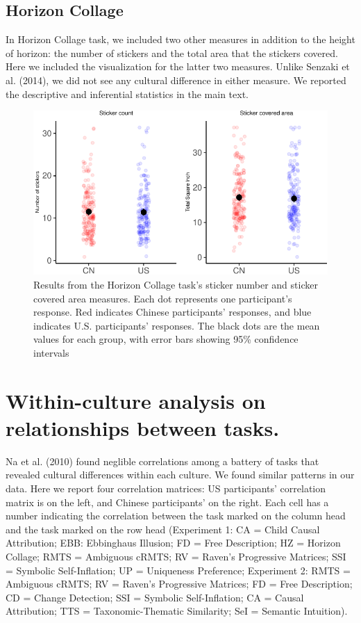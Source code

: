\documentclass[
  man,floatsintext]{apa6}
\begin{document}
\hypertarget{horizon-collage-2}{%
\subsection{Horizon Collage}\label{horizon-collage-2}}

In Horizon Collage task, we included two other measures in addition to the height of horizon: the number of stickers and the total area that the stickers covered. Here we included the visualization for the latter two measures. Unlike Senzaki et al. (2014), we did not see any cultural difference in either measure. We reported the descriptive and inferential statistics in the main text.

\begin{figure}
\centering
\includegraphics{CCRR_manuscript_files/figure-latex/unnamed-chunk-50-1.pdf}
\caption{\label{fig:unnamed-chunk-50}Results from the Horizon Collage task's sticker number and sticker covered area measures. Each dot represents one participant's response. Red indicates Chinese participants' responses, and blue indicates U.S. participants' responses. The black dots are the mean values for each group, with error bars showing 95\% confidence intervals}
\end{figure}

\hypertarget{within-culture-analysis-on-relationships-between-tasks.}{%
\section{Within-culture analysis on relationships between tasks.}\label{within-culture-analysis-on-relationships-between-tasks.}}

Na et al. (2010) found neglible correlations among a battery of tasks that revealed cultural differences within each culture. We found similar patterns in our data. Here we report four correlation matrices: US participants' correlation matrix is on the left, and Chinese participants' on the right. Each cell has a number indicating the correlation between the task marked on the column head and the task marked on the row head (Experiment 1: CA = Child Causal Attribution; EBB: Ebbinghaus Illusion; FD = Free Description; HZ = Horizon Collage; RMTS = Ambiguous cRMTS; RV = Raven's Progressive Matrices; SSI = Symbolic Self-Inflation; UP = Uniqueness Preference; Experiment 2: RMTS = Ambiguous cRMTS; RV = Raven's Progressive Matrices; FD = Free Description; CD = Change Detection; SSI = Symbolic Self-Inflation; CA = Causal Attribution; TTS = Taxonomic-Thematic Similarity; SeI = Semantic Intuition).
\end{document}
